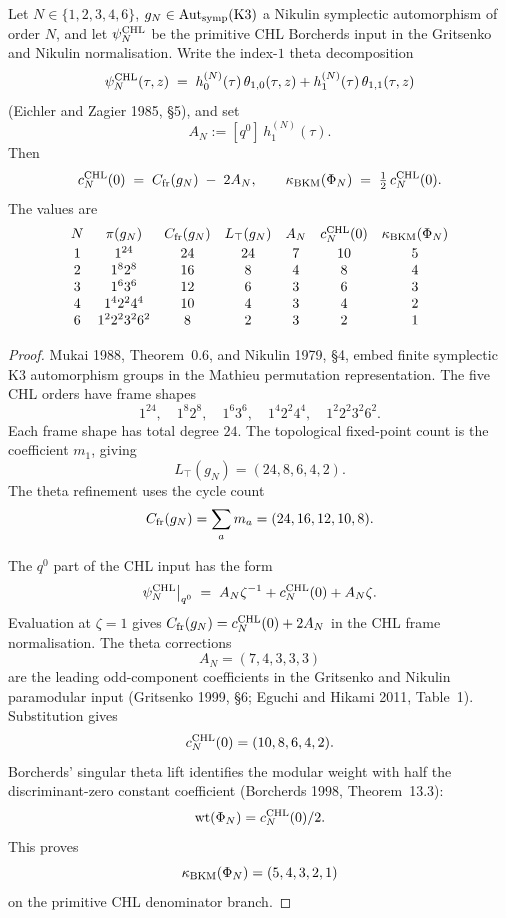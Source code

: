 \begin{theorem}
Let $N \in \{1,2,3,4,6\}$, $g_N \in \mathrm{Aut}_{\mathrm{symp}}(\mathrm{K3})$ a Nikulin
symplectic automorphism of order $N$, and let $\psi_N^{\mathrm{CHL}}$ be the
primitive CHL Borcherds input in the Gritsenko and Nikulin
normalisation. Write the index-$1$ theta decomposition
\[
  \psi_N^{\mathrm{CHL}}(\tau, z)
    \;=\; h^{(N)}_0(\tau)\,\theta_{1,0}(\tau, z)
        + h^{(N)}_1(\tau)\,\theta_{1,1}(\tau, z)
\]
(Eichler and Zagier 1985, \S5), and set
\[
  A_N := [q^0]\,h^{(N)}_1(\tau).
\]
Then
\begin{equation}
  c_N^{\mathrm{CHL}}(0) \;=\; C_{\mathrm{fr}}(g_N) \;-\; 2 A_N,
  \qquad
  \kappa_{\mathrm{BKM}}(\Phi_N)
    \;=\; \tfrac12\,c_N^{\mathrm{CHL}}(0).
\end{equation}
The values are
\[
\begin{array}{c c c c c c c}
N & \pi(g_N) & C_{\mathrm{fr}}(g_N) & L_{\top}(g_N) &
A_N & c_N^{\mathrm{CHL}}(0) & \kappa_{\mathrm{BKM}}(\Phi_N)\\[2pt]
1 & 1^{24} & 24 & 24 & 7 & 10 & 5\\
2 & 1^8 2^8 & 16 & 8 & 4 & 8 & 4\\
3 & 1^6 3^6 & 12 & 6 & 3 & 6 & 3\\
4 & 1^4 2^2 4^4 & 10 & 4 & 3 & 4 & 2\\
6 & 1^2 2^2 3^2 6^2 & 8 & 2 & 3 & 2 & 1
\end{array}
\]
\end{theorem}

\begin{proof}
Mukai 1988, Theorem~0.6, and Nikulin 1979, \S4, embed finite
symplectic K3 automorphism groups in the Mathieu permutation
representation.  The five CHL orders have frame shapes
\[
  1^{24},\quad 1^8 2^8,\quad 1^6 3^6,\quad
  1^4 2^2 4^4,\quad 1^2 2^2 3^2 6^2 .
\]
Each frame shape has total degree $24$.  The topological fixed-point
count is the coefficient $m_1$, giving
\[
  L_{\top}(g_N)=(24,8,6,4,2).
\]
The theta refinement uses the cycle count
\[
  C_{\mathrm{fr}}(g_N)=\sum_a m_a=(24,16,12,10,8).
\]

The $q^0$ part of the CHL input has the form
\[
  \psi_N^{\mathrm{CHL}}\big|_{q^0}
    \;=\; A_N\zeta^{-1}+c_N^{\mathrm{CHL}}(0)+A_N\zeta .
\]
Evaluation at $\zeta=1$ gives
$C_{\mathrm{fr}}(g_N)=c_N^{\mathrm{CHL}}(0)+2A_N$ in the CHL frame normalisation.
The theta corrections
\[
  A_N=(7,4,3,3,3)
\]
are the leading odd-component coefficients in the Gritsenko and
Nikulin paramodular input (Gritsenko 1999, \S6; Eguchi and Hikami
2011, Table~1).  Substitution gives
\[
  c_N^{\mathrm{CHL}}(0)=(10,8,6,4,2).
\]
Borcherds' singular theta lift identifies the modular weight with half
the discriminant-zero constant coefficient (Borcherds 1998,
Theorem~13.3):
\[
  \operatorname{wt}(\Phi_N)=c_N^{\mathrm{CHL}}(0)/2.
\]
This proves
\[
  \kappa_{\mathrm{BKM}}(\Phi_N)=(5,4,3,2,1)
\]
on the primitive CHL denominator branch.
\end{proof}

